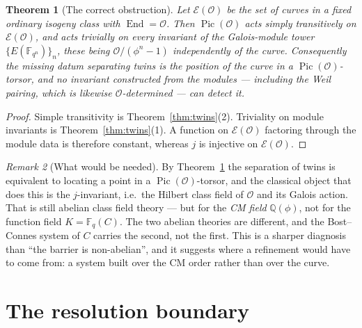 \documentclass[11pt]{amsart}
\numberwithin{equation}{section}
\newtheorem{theorem}{Theorem}[section]
\theoremstyle{definition}
\theoremstyle{remark}
\newtheorem{remark}[theorem]{Remark}
\newcommand{\Q}{\mathbb{Q}}
\newcommand{\F}{\mathbb{F}}
\newcommand{\cO}{\mathcal{O}}
\newcommand{\Pic}{\operatorname{Pic}}
\newcommand{\End}{\operatorname{End}}
\begin{document}
\begin{theorem}[The correct obstruction]\label{thm:torsor}
Let $\mathcal E(\cO)$ be the set of curves in a fixed ordinary isogeny class with
$\End=\cO$. Then $\Pic(\cO)$ acts simply transitively on $\mathcal E(\cO)$, and acts
\emph{trivially} on every invariant of the Galois-module tower $\{E(\F_{q^n})\}_n$, these being
$\cO/(\phi^n-1)$ independently of the curve. Consequently the missing datum separating twins
is the position of the curve in a $\Pic(\cO)$-torsor, and no invariant constructed from the
modules --- including the Weil pairing, which is likewise $\cO$-determined --- can detect it.
\end{theorem}

\begin{proof}
Simple transitivity is Theorem~\ref{thm:twins}(2). Triviality on module invariants is
Theorem~\ref{thm:twins}(1). A function on $\mathcal E(\cO)$ factoring through the module data
is therefore constant, whereas $j$ is injective on $\mathcal E(\cO)$.
\end{proof}

\begin{remark}[What would be needed]\label{rem:needed}
By Theorem~\ref{thm:torsor} the separation of twins is equivalent to locating a point in a
$\Pic(\cO)$-torsor, and the classical object that does this is the $j$-invariant, i.e.\ the
Hilbert class field of $\cO$ and its Galois action. That is still abelian class field theory
--- but for the \emph{CM field} $\Q(\phi)$, not for the function field $K=\F_q(C)$. The two
abelian theories are different, and the Bost--Connes system of $C$ carries the second, not the
first. This is a sharper diagnosis than ``the barrier is non-abelian'', and it suggests
where a refinement would have to come from: a system built over the CM order rather than over
the curve.
\end{remark}

\section{The resolution boundary}
\end{document}
